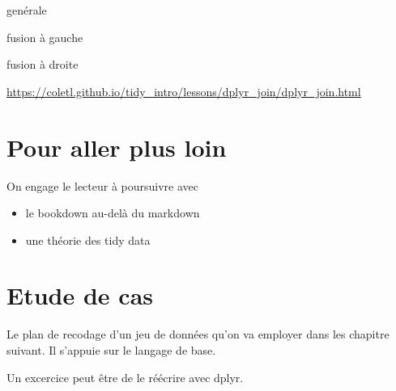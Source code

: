 \documentclass[
]{book}
\providecommand{\tightlist}{%
  \setlength{\itemsep}{0pt}\setlength{\parskip}{0pt}}
\begin{document}
genérale

fusion à gauche

fusion à droite

\url{https://coletl.github.io/tidy_intro/lessons/dplyr_join/dplyr_join.html}

\hypertarget{pour-aller-plus-loin}{%
\section{Pour aller plus loin}\label{pour-aller-plus-loin}}

On engage le lecteur à poursuivre avec

\begin{itemize}
\tightlist
\item
  le bookdown au-delà du markdown
\item
  une théorie des tidy data
\end{itemize}

\hypertarget{etude-de-cas}{%
\section{Etude de cas}\label{etude-de-cas}}

Le plan de recodage d'un jeu de données qu'on va employer dans les chapitre suivant. Il s'appuie sur le langage de base.

Un excercice peut être de le réécrire avec dplyr.
\end{document}
